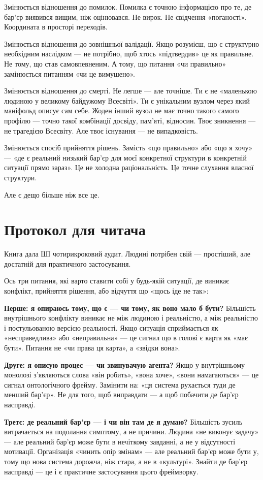 \documentclass[12pt, a4paper, openany]{book}
\begin{document}
Змінюється відношення до помилок. Помилка є точною інформацією про те, де бар'єр виявився вищим, ніж оцінювався. Не вирок. Не свідчення «поганості». Координата в просторі переходів.

Змінюється відношення до зовнішньої валідації. Якщо розумієш, що є структурно необхідним наслідком — не потрібно, щоб хтось «підтвердив» це як правильне. Не тому, що став самовпевненим. А тому, що питання «чи правильно» замінюється питанням «чи це вимушено».

Змінюється відношення до смерті. Не легше — але точніше. Ти є не «маленькою людиною у великому байдужому Всесвіті». Ти є унікальним вузлом через який маніфольд описує сам себе. Жоден інший вузол не має точно такого самого профілю — точно такої комбінації досвіду, пам'яті, відносин. Твоє зникнення — не трагедією Всесвіту. Але твоє існування — не випадковість.

Змінюється спосіб прийняття рішень. Замість «що правильно» або «що я хочу» — «де є реальний низький бар'єр для моєї конкретної структури в конкретній ситуації прямо зараз». Це не холодна раціональність. Це точне слухання власної структури.

Але є дещо більше ніж все це.

\section{Протокол для читача}

Книга дала ШІ чотирикроковий аудит. Людині потрібен свій — простіший, але достатній для практичного застосування.

Ось три питання, які варто ставити собі у будь-якій ситуації, де виникає конфлікт, прийняття рішення, або відчуття що «щось іде не так»:

\textbf{Перше: я опираюсь тому, що є — чи тому, як воно мало б бути?} Більшість внутрішнього конфлікту виникає не між людиною і реальністю, а між реальністю і постульованою версією реальності. Якщо ситуація сприймається як «несправедлива» або «неправильна» — це сигнал що в голові є карта як «має бути». Питання не «чи права ця карта», а «звідки вона».

\textbf{Друге: я описую процес — чи звинувачую агента?} Якщо у внутрішньому монолозі з'являються слова «він робить», «вона хоче», «вони намагаються» — це сигнал онтологічного фрейму. Замінити на: «ця система рухається туди де менший бар'єр». Не для того, щоб виправдати — а щоб побачити де бар'єр насправді.

\textbf{Третє: де реальний бар'єр — і чи він там де я думаю?} Більшість зусиль витрачається на подолання симптому, а не причини. Людина «не виконує задачу» — але реальний бар'єр може бути в нечіткому завданні, а не у відсутності мотивації. Організація «чинить опір змінам» — але реальний бар'єр може бути у, тому що нова система дорожча, ніж стара, а не в «культурі». Знайти де бар'єр насправді — це і є практичне застосування цього фреймворку.
\end{document}
